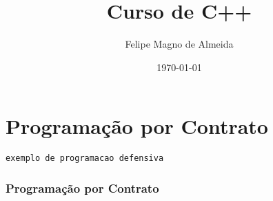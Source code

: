 \documentclass[14pt]{beamer}
\title{Curso de C++}
\author{Felipe Magno de Almeida}
\date{\today}
\begin{document}
\frame
{
  \titlepage
}

\frame
{
  \tableofcontents
}

\section{Programação por Contrato}

\newsavebox{\listingboxa}
\begin{lrbox}{\listingboxa}
\begin{lstlisting}[mathescape=true]
exemplo de programacao defensiva
\end{lstlisting}
\end{lrbox}

\frame
{
  \frametitle{Programação por Contrato}

  \usebox{\listingboxa}
}
\end{document}
